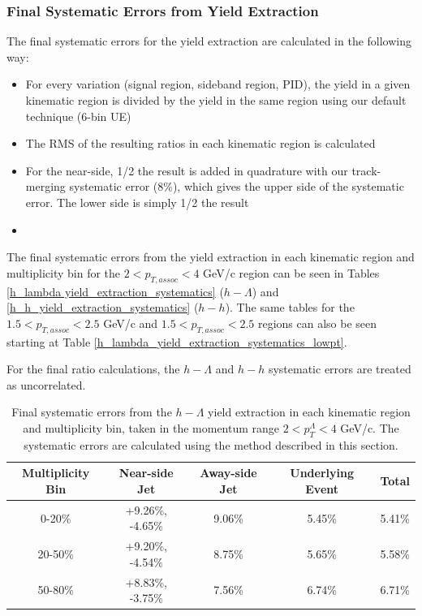 \documentclass[ALICE,manyauthors]{ALICE_analysis_notes}
\begin{document}
\subsubsection{Final Systematic Errors from Yield Extraction}
The final systematic errors for the yield extraction are calculated in the following way:
\begin{itemize}
\item For every variation (signal region, sideband region, PID), the yield in a given kinematic region is divided by the yield in the same region using our default technique (6-bin UE)
\item The RMS of the resulting ratios in each kinematic region is calculated
\item For the near-side, 1/2 the result is added in quadrature with our track-merging systematic error (8\%), which gives the upper side of the systematic error. The lower side is simply 1/2 the result
\item 
\end{itemize}

The final systematic errors from the yield extraction in each kinematic region and multiplicity bin for the  $2 < p_{T, assoc} < 4$ GeV/c region can be seen in Tables \ref{h_lambda yield_extraction_systematics} ($h-\Lambda$) and \ref{h_h_yield_extraction_systematics} ($h-h$). The same tables for the  $1.5 < p_{T, assoc} < 2.5$ GeV/c and  $1.5 < p_{T, assoc} < 2.5$ regions can also be seen starting at Table \ref{h_lambda_yield_extraction_systematics_lowpt}. 

For the final ratio calculations, the $h-\Lambda$ and $h-h$ systematic errors are treated as uncorrelated.

\begin{table}[h!]
\centering
\begin{tabular}{| c | c | c | c | c | }
\hline
Multiplicity Bin & Near-side Jet & Away-side Jet & Underlying Event & Total  \\
\hline
0-20\% & +9.26\%, -4.65\% & 9.06\%  & 5.45\% & 5.41\% \\
20-50\% & +9.20\%, -4.54\%  & 8.75\%  & 5.65\% & 5.58\% \\
50-80\% & +8.83\%, -3.75\%  & 7.56\%  & 6.74\% & 6.71\% \\
\hline
\end{tabular}
\caption{Final systematic errors from the $h-\Lambda$ yield extraction in each kinematic region and multiplicity bin, taken in the momentum range $2 < p_{T}^{\Lambda} < 4$ GeV/c. The systematic errors are calculated using the method described in this section.}
\label{h_lambda_yield_extraction_systematics}
\end{table}
\end{document}
